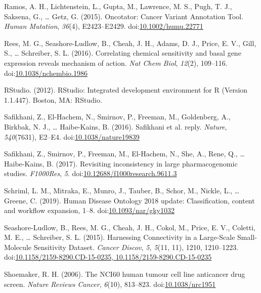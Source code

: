 \documentclass[man,floatsintext]{apa6}
\begin{document}
\hypertarget{ref-ramos2015a}{}
Ramos, A. H., Lichtenstein, L., Gupta, M., Lawrence, M. S., Pugh, T. J.,
Saksena, G., \ldots{} Getz, G. (2015). Oncotator: Cancer Variant
Annotation Tool. \emph{Human Mutation}, \emph{36}(4), E2423--E2429.
doi:\href{https://doi.org/10.1002/humu.22771}{10.1002/humu.22771}

\hypertarget{ref-rees2016}{}
Rees, M. G., Seashore-Ludlow, B., Cheah, J. H., Adams, D. J., Price, E.
V., Gill, S., \ldots{} Schreiber, S. L. (2016). Correlating chemical
sensitivity and basal gene expression reveals mechanism of action.
\emph{Nat Chem Biol}, \emph{12}(2), 109--116.
doi:\href{https://doi.org/10.1038/nchembio.1986}{10.1038/nchembio.1986}

\hypertarget{ref-rstudio2012}{}
RStudio. (2012). RStudio: Integrated development environment for R
(Version 1.1.447). Boston, MA: RStudio.

\hypertarget{ref-safikhani2016}{}
Safikhani, Z., El-Hachem, N., Smirnov, P., Freeman, M., Goldenberg, A.,
Birkbak, N. J., \ldots{} Haibe-Kains, B. (2016). Safikhani et al. reply.
\emph{Nature}, \emph{540}(7631), E2--E4.
doi:\href{https://doi.org/10.1038/nature19839}{10.1038/nature19839}

\hypertarget{ref-safikhani2017}{}
Safikhani, Z., Smirnov, P., Freeman, M., El-Hachem, N., She, A., Rene,
Q., \ldots{} Haibe-Kains, B. (2017). Revisiting inconsistency in large
pharmacogenomic studies. \emph{F1000Res}, \emph{5}.
doi:\href{https://doi.org/10.12688/f1000research.9611.3}{10.12688/f1000research.9611.3}

\hypertarget{ref-schriml2019}{}
Schriml, L. M., Mitraka, E., Munro, J., Tauber, B., Schor, M., Nickle,
L., \ldots{} Greene, C. (2019). Human Disease Ontology 2018 update:
Classification, content and workflow expansion, 1--8.
doi:\href{https://doi.org/10.1093/nar/gky1032}{10.1093/nar/gky1032}

\hypertarget{ref-seashore-ludlow2015}{}
Seashore-Ludlow, B., Rees, M. G., Cheah, J. H., Cokol, M., Price, E. V.,
Coletti, M. E., \ldots{} Schreiber, S. L. (2015). Harnessing
Connectivity in a Large-Scale Small-Molecule Sensitivity Dataset.
\emph{Cancer Discov}, \emph{5, 5}(11, 11), 1210, 1210--1223.
doi:\href{https://doi.org/10.1158/2159-8290.CD-15-0235,\%2010.1158/2159-8290.CD-15-0235}{10.1158/2159-8290.CD-15-0235, 10.1158/2159-8290.CD-15-0235}

\hypertarget{ref-shoemaker2006}{}
Shoemaker, R. H. (2006). The NCI60 human tumour cell line anticancer
drug screen. \emph{Nature Reviews Cancer}, \emph{6}(10), 813--823.
doi:\href{https://doi.org/10.1038/nrc1951}{10.1038/nrc1951}
\end{document}
